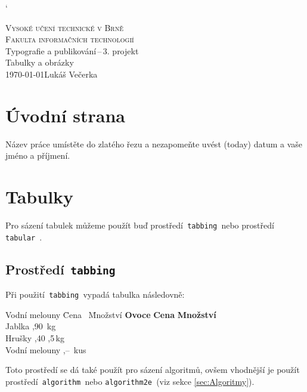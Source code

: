 \documentclass[hidelinks, 11pt, a4paper]{article}
\begin{document}
\catcode` %
\begin{titlepage}
    \begin{center}
        \Huge \textsc{Vysoké učení technické v Brně}\\
        \huge \textsc{Fakulta informačních technologií}\\[0.5em]
        {\LARGE Typografie a publikování\,--\,3. projekt\\[-0.2em]}
        \Huge Tabulky a obrázky\\
        {\Large \today \hfill Lukáš Večerka}\\
    \end{center}
\end{titlepage}


\section{Úvodní strana}
Název práce umístěte do zlatého řezu a nezapomeňte uvést  (today) datum a vaše jméno a příjmení.

\section{Tabulky}
Pro sázení tabulek můžeme použít buď prostředí\texttt{ tabbing }nebo prostředí\texttt{ tabular }.

\subsection{Prostředí\texttt{ tabbing}}
Při použití\texttt{ tabbing }vypadá tabulka následovně:
\begin{tabbing}
Vodní melouny \quad \= Cena \quad\  \= Množství \kill
\textbf{Ovoce} \> \textbf{Cena} \> \textbf{Množství} \\
Jablka ,90 \,kg \\ 
Hrušky ,40 ,5\,kg \\ 
Vodní melouny ,-- \,kus \\ 
\end{tabbing}
Toto prostředí se dá také použít pro sázení algoritmů, ovšem vhodnější je použít prostředí\texttt{ algorithm~}nebo \texttt{algorithm2e }(viz sekce \ref{sec:Algoritmy}).
\end{document}
